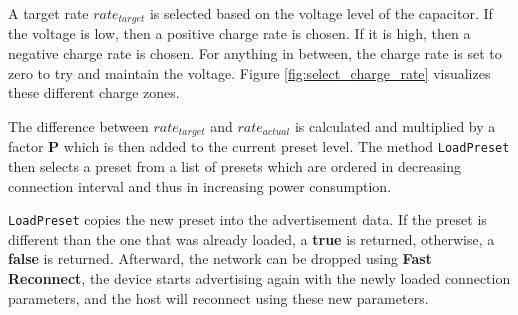 A target rate $rate_{target}$ is selected based on the voltage level of the capacitor. If the voltage is low, then a positive charge rate is chosen. If it is high, then a negative charge rate is chosen. For anything in between, the charge rate is set to zero to try and maintain the voltage. Figure \ref{fig:select_charge_rate} visualizes these different charge zones.

The difference between $rate_{target}$ and $rate_{actual}$ is calculated and multiplied by a factor \textbf{P} which is then added to the current preset level. The method \texttt{LoadPreset} then selects a preset from a list of presets which are ordered in decreasing connection interval and thus in increasing power consumption.

\texttt{LoadPreset} copies the new preset into the advertisement data. If the preset is different than the one that was already loaded, a \textbf{true} is returned, otherwise, a \textbf{false} is returned. Afterward, the network can be dropped using \textbf{Fast Reconnect}, the device starts advertising again with the newly loaded connection parameters, and the host will reconnect using these new parameters.

